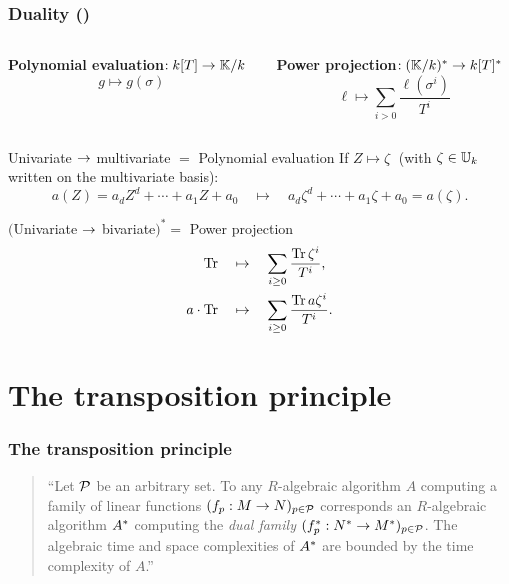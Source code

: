 \documentclass[10pt,usepdftitle=false]{beamer}
\begin{document}
\begin{frame}
  \frametitle{Duality (\cite{shoup95,shoup99,bostan+salvy+schost03})}

  \vspace{-6mm}

  \begin{columns}[b]
    \begin{column}{0.5\textwidth}
      \begin{center}
        \textbf{Polynomial evaluation}$:k[T]\rightarrow\mathbb{K}/k$
        \[g\mapsto g(\sigma)\]
      \end{center}
    \end{column}
    \begin{column}{0.5\textwidth}
      \begin{center}
        \textbf{Power projection}$:(\mathbb{K}/k)^\ast\rightarrow k[T]^\ast$
        \[\ell \mapsto \sum_{i>0} \frac{\ell(\sigma^i)}{T^i}\]
      \end{center}
    \end{column}
  \end{columns}

  \begin{block}{Univariate $\rightarrow$ multivariate $=$ Polynomial evaluation}
    If $Z \mapsto \zeta\;$ (with $\zeta\in\mathbb{U}_k$ written on the
    multivariate basis):
    \[a(Z) = a_dZ^d + \cdots + a_1Z + a_0 \quad\mapsto\quad a_d\zeta^d + \cdots + a_1\zeta + a_0 =a(\zeta)\text{.}\]
  \end{block}

  \begin{block}{$($Univariate $\rightarrow$ bivariate$)^\ast=$ Power projection}
    \begin{align*}
      \operatorname{Tr} &\quad\mapsto\quad \sum_{i\ge0}\frac{\operatorname{Tr}\zeta^i}{T^i}\text{,}\\
      a\cdot\operatorname{Tr} &\quad\mapsto\quad \sum_{i\ge0}\frac{\operatorname{Tr} a\zeta^i}{T^i}\text{.}
    \end{align*}
  \end{block}
\end{frame}


\section{The transposition principle}

\begin{frame}
  \frametitle{The transposition principle}

  \begin{quote}
    \large ``Let $\mathcal{P}$ be an arbitrary set. To any $R$-algebraic
    algorithm $A$ computing a family of linear functions $(f_p:M\rightarrow
    N)_{p\in\mathcal{P}}$ corresponds an $R$-algebraic algorithm
    $A^\ast$ computing the \emph{dual family}
    $(f^\ast_p:N^\ast\rightarrow M^\ast)_{p\in\mathcal{P}}$. The algebraic
    time and space complexities of $A^\ast$ are bounded by the time
    complexity of $A$.''
  \end{quote}
  
\end{frame}
\end{document}
